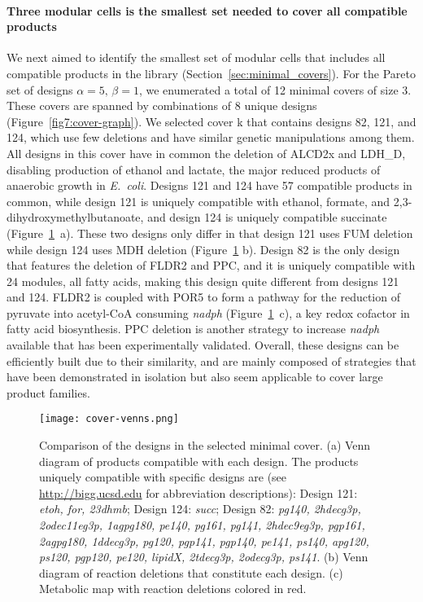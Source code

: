 {\paragraph{Three modular cells is the smallest set needed to cover all compatible products}
We next aimed to identify the smallest set of modular cells that includes all compatible products in the library (Section~\ref{sec:minimal_covers}).
For the Pareto set of designs $\alpha=5,\,\beta=1$, we enumerated a total of 12 minimal covers of size 3.
These covers are spanned by combinations of 8 unique designs (Figure~\ref{fig7:cover-graph}).
We selected cover k that contains designs 82, 121, and 124, which use few deletions and have similar genetic manipulations among them.
All designs in this cover have in common the deletion of ALCD2x and LDH\_D, disabling production of ethanol and lactate, the major reduced products of anaerobic growth in \textit{E.~coli}.
Designs 121 and 124 have 57 compatible products in common, while design 121 is uniquely compatible with ethanol, formate, and 2,3-dihydroxymethylbutanoate, and design 124 is uniquely compatible succinate (Figure~\ref{fig7:design-comparison}~a).
These two designs only differ in that design 121 uses FUM deletion while design 124 uses MDH deletion (Figure~\ref{fig7:design-comparison} b).
Design 82 is the only design that features the deletion of FLDR2 and PPC, and it is uniquely compatible with 24 modules, all fatty acids, making this design quite different from designs 121 and 124.
FLDR2 is coupled with POR5 to form a pathway for the reduction of pyruvate into acetyl-CoA consuming \textit{nadph} (Figure~\ref{fig7:design-comparison}~c), a key redox cofactor in fatty acid biosynthesis.
PPC deletion is another strategy to increase \textit{nadph} available that has been experimentally validated.\citep{chemler2010}
Overall, these designs can be efficiently built due to their similarity,  and are mainly composed of strategies that have been demonstrated in isolation but also seem applicable to cover large product families.

\begin{figure}[hp]
    \centering
    \texttt{[image: cover-venns.png]}
    \caption[Comparison of the designs in the selected minimal cover]{Comparison of the designs in the selected minimal cover. (a) Venn diagram of products compatible with each design. The products uniquely compatible with specific designs are (see \protect\url{http://bigg.ucsd.edu} for abbreviation descriptions):
       Design 121: \textit{etoh, for, 23dhmb};
       Design 124: \textit{succ};
       Design 82: \textit{pg140, 2hdecg3p, 2odec11eg3p, 1agpg180, pe140, pg161, pg141, 2hdec9eg3p, pgp161, 2agpg180, 1ddecg3p, pg120, pgp141, pgp140, pe141, ps140, apg120, ps120, pgp120, pe120, lipidX, 2tdecg3p, 2odecg3p, ps141}.
    (b) Venn diagram of reaction deletions that constitute each design.
    (c) Metabolic map with reaction deletions colored in red.
       }
    \label{fig7:design-comparison}
\end{figure}


}
